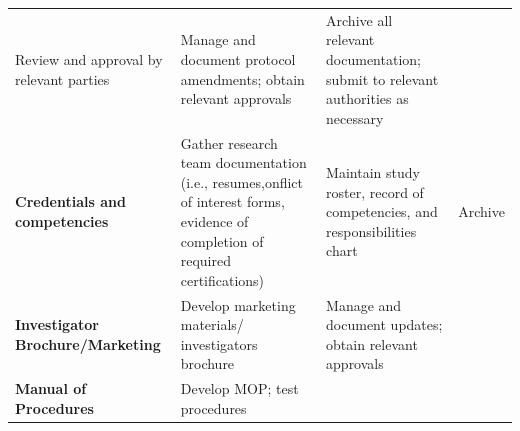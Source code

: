 \documentclass[]{book}
\theoremstyle{definition}
\theoremstyle{definition}
\theoremstyle{definition}
\theoremstyle{remark}
\begin{document}
\begin{longtable}[]{@{}llll@{}}
\begin{minipage}[t]{0.23\columnwidth}
Review and approval by relevant parties\strut
\end{minipage} & \begin{minipage}[t]{0.21\columnwidth}\raggedright\strut
Manage and document protocol amendments; obtain relevant approvals\strut
\end{minipage} & \begin{minipage}[t]{0.25\columnwidth}\raggedright\strut
Archive all relevant documentation; submit to relevant authorities as
necessary\strut
\end{minipage}\tabularnewline
\begin{minipage}[t]{0.19\columnwidth}\raggedright\strut
\textbf{Credentials and competencies}\strut
\end{minipage} & \begin{minipage}[t]{0.23\columnwidth}\raggedright\strut
Gather research team documentation (i.e., resumes,onflict of interest
forms, evidence of completion of required certifications)\strut
\end{minipage} & \begin{minipage}[t]{0.21\columnwidth}\raggedright\strut
Maintain study roster, record of competencies, and responsibilities
chart\strut
\end{minipage} & \begin{minipage}[t]{0.25\columnwidth}\raggedright\strut
Archive\strut
\end{minipage}\tabularnewline
\begin{minipage}[t]{0.19\columnwidth}\raggedright\strut
\textbf{Investigator Brochure/Marketing}\strut
\end{minipage} & \begin{minipage}[t]{0.23\columnwidth}\raggedright\strut
Develop marketing materials/ investigators brochure\strut
\end{minipage} & \begin{minipage}[t]{0.21\columnwidth}\raggedright\strut
Manage and document updates; obtain relevant approvals\strut
\end{minipage} & \begin{minipage}[t]{0.25\columnwidth}\raggedright\strut
\strut
\end{minipage}\tabularnewline
\begin{minipage}[t]{0.19\columnwidth}\raggedright\strut
\textbf{Manual of Procedures}\strut
\end{minipage} & \begin{minipage}[t]{0.23\columnwidth}\raggedright\strut
Develop MOP; test procedures\strut
\end{minipage} & \begin{minipage}[t]{0.21\columnwidth}\raggedright\strut

\end{minipage}
\end{longtable}
\end{document}
